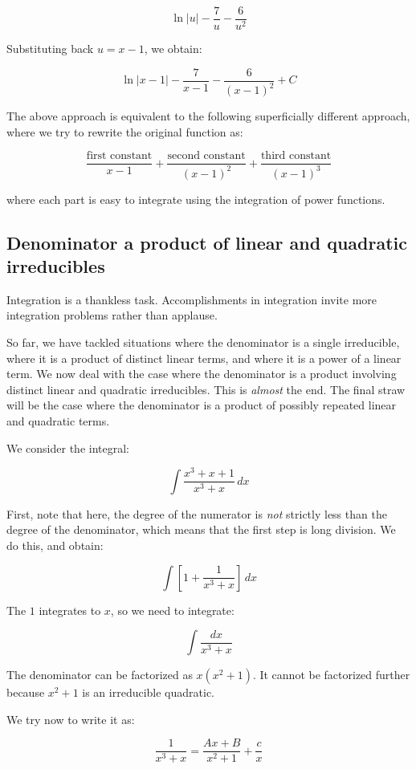 \documentclass[10pt]{amsart}
\begin{document}
$$\ln|u| - \frac{7}{u} - \frac{6}{u^2}$$

Substituting back $u = x - 1$, we obtain:

$$\ln|x - 1| - \frac{7}{x - 1} - \frac{6}{(x - 1)^2} + C$$

The above approach is equivalent to the following superficially
different approach, where we try to rewrite the original function as:

$$\frac{\text{first constant}}{x - 1} + \frac{\text{second constant}}{(x - 1)^2} + \frac{\text{third constant}}{(x- 1)^3}$$

where each part is easy to integrate using the integration of power
functions. 

\subsection{Denominator a product of linear and quadratic irreducibles}

Integration is a thankless task. Accomplishments in integration invite
more integration problems rather than applause.

So far, we have tackled situations where the denominator is a single
irreducible, where it is a product of distinct linear terms, and where
it is a power of a linear term. We now deal with the case where the
denominator is a product involving distinct linear and quadratic
irreducibles. This is {\em almost} the end. The final straw will be
the case where the denominator is a product of possibly repeated
linear and quadratic terms.

We consider the integral:

$$\int \frac{x^3 + x + 1}{x^3 + x} \, dx$$

First, note that here, the degree of the numerator is {\em not}
strictly less than the degree of the denominator, which means that the
first step is long division. We do this, and obtain:

$$\int \left[1 + \frac{1}{x^3 + x}\right] \, dx$$

The $1$ integrates to $x$, so we need to integrate:

$$\int \frac{dx}{x^3 + x}$$

The denominator can be factorized as $x(x^2 + 1)$. It cannot be
factorized further because $x^2 + 1$ is an irreducible quadratic.

We try now to write it as:

$$\frac{1}{x^3 + x} = \frac{Ax + B}{x^2 + 1} + \frac{c}{x}$$
\end{document}

